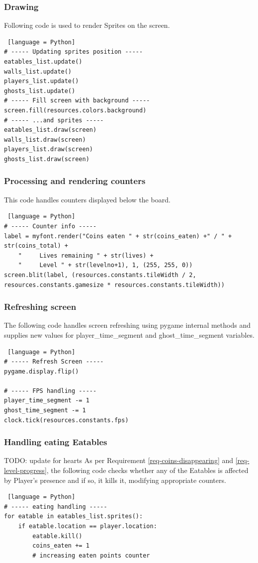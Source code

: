 \documentclass[11pt,a4paper]{report}
\begin{document}
				\subsubsection{Drawing}
					Following code is used to render Sprites on the screen.
					\begin{lstlisting} [language = Python]
# ----- Updating sprites position -----
eatables_list.update()
walls_list.update()
players_list.update()
ghosts_list.update()
# ----- Fill screen with background -----
screen.fill(resources.colors.background)
# ----- ...and sprites -----
eatables_list.draw(screen)
walls_list.draw(screen)
players_list.draw(screen)
ghosts_list.draw(screen)
					\end{lstlisting}
				\subsubsection{Processing and rendering counters}
					This code handles counters displayed below the board.
					\begin{lstlisting} [language = Python]	
# ----- Counter info -----
label = myfont.render("Coins eaten " + str(coins_eaten) +" / " + str(coins_total) +
	"     Lives remaining " + str(lives) +
	"     Level " + str(levelno+1), 1, (255, 255, 0))
screen.blit(label, (resources.constants.tileWidth / 2, resources.constants.gamesize * resources.constants.tileWidth))
					\end{lstlisting}
				\subsubsection{Refreshing screen}
					The following code handles screen refreshing using pygame internal methods and supplies new values for player\_time\_segment and ghost\_time\_segment variables.
					\begin{lstlisting} [language = Python]
# ----- Refresh Screen -----
pygame.display.flip()

# ----- FPS handling -----
player_time_segment -= 1
ghost_time_segment -= 1
clock.tick(resources.constants.fps)
					\end{lstlisting}
				\subsubsection{Handling eating Eatables}
					TODO: update for hearts
					As per Requirement \ref{req-coins-disappearing} and \ref{req-level-progress}, the following code checks whether any of the Eatables is affected by Player's presence and if so, it kills it, modifying appropriate counters.
					\begin{lstlisting} [language = Python]
# ----- eating handling -----
for eatable in eatables_list.sprites():
	if eatable.location == player.location:
		eatable.kill()
		coins_eaten += 1
		# increasing eaten points counter
					\end{lstlisting}
\end{document}
